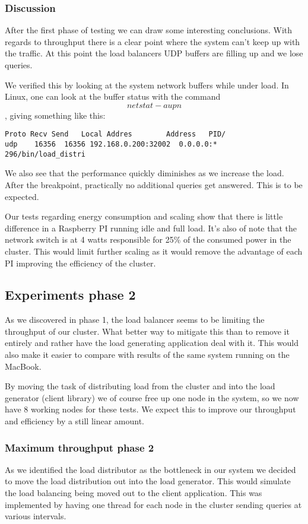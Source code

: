 \subsubsection{Discussion}
After the first phase of testing we can draw some interesting conclusions. With regards to throughput there is a clear point where the system can't keep up with the traffic. At this point the load balancers UDP buffers are filling up and we lose queries.

We verified this by looking at the system network buffers while under load. In Linux, one can look at the buffer status with the command $$netstat -aupn$$, giving something like this:
\begin{lstlisting}
Proto Recv Send   Local Addres        Address   PID/
udp    16356  16356 192.168.0.200:32002  0.0.0.0:*   296/bin/load_distri
\end{lstlisting}

We also see that the performance quickly diminishes as we increase the load. After the breakpoint, practically no additional queries get answered.
This is to be expected.

Our tests regarding energy consumption and scaling show that there is little difference in a Raspberry PI running idle and full load. It's also of note that the network switch is at 4 watts responsible for 25\% of the consumed power in the cluster. This would limit further scaling as it would remove the advantage of each PI improving the efficiency of the cluster.

\subsection{Experiments phase 2}
As we discovered in phase 1, the load balancer seems to be limiting the throughput of our cluster. What better way to mitigate this than to remove it entirely and rather have the load generating application deal with it. This would also make it easier to compare with results of the same system running on the MacBook.

By moving the task of distributing load from the cluster and into the load generator (client library) we of course free up one node in the system, so we now have 8 working nodes for these tests. We expect this to improve our throughput and efficiency by a still linear amount.

\subsubsection{Maximum throughput phase 2}
As we identified the load distributor as the bottleneck in our system we decided to move the load distribution out into the load generator. This would simulate the load balancing being moved out to the client application. This was implemented by having one thread for each node in the cluster sending queries at various intervals.

